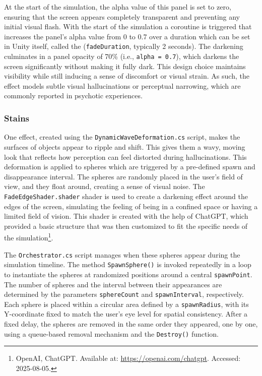 At the start of the simulation, the alpha value of this panel is set to zero, ensuring that the screen appears completely transparent and preventing any initial visual flash. With the start of the simulation a coroutine is triggered that increases the panel’s alpha value from 0 to 0.7 over a duration which can be set in Unity itself, called the (\texttt{fadeDuration}, typically 2 seconds). The darkening culminates in a panel opacity of 70\% (i.e., \texttt{alpha = 0.7}), which darkens the screen significantly without making it fully dark. This design choice maintains visibility while still inducing a sense of discomfort or visual strain. As such, the effect models subtle visual hallucinations or perceptual narrowing, which are commonly reported in psychotic experiences. 

\subsubsection{Stains}
One effect, created using the \texttt{DynamicWaveDeformation.cs} script, makes the surfaces of objects appear to ripple and shift. This gives them a wavy, moving look that reflects how perception can feel distorted during hallucinations. This deformation is applied to spheres which are triggered by a pre-defined spawn and disappearance interval. The spheres are randomly placed in the user's field of view, and they float around, creating a sense of visual noise. The \texttt{FadeEdgeShader.shader} shader is used to create a darkening effect around the edges of the screen, simulating the feeling of being in a confined space or having a limited field of vision. This shader is created with the help of ChatGPT, which provided a basic structure that was then customized to fit the specific needs of the simulation\footnote{OpenAI, ChatGPT. Available at: \url{https://openai.com/chatgpt}. Accessed: 2025-08-05.}.

\vspace{1em}

The \texttt{Orchestrator.cs} script manages when these spheres appear during the simulation timeline. The method \texttt{SpawnSphere()} is invoked repeatedly in a loop to instantiate the spheres at randomized positions around a central \texttt{spawnPoint}. The number of spheres and the interval between their appearances are determined by the parameters \texttt{sphereCount} and \texttt{spawnInterval}, respectively. Each sphere is placed within a circular area defined by a \texttt{spawnRadius}, with its Y-coordinate fixed to match the user’s eye level for spatial consistency. After a fixed delay, the spheres are removed in the same order they appeared, one by one, using a queue-based removal mechanism and the \texttt{Destroy()} function. 

